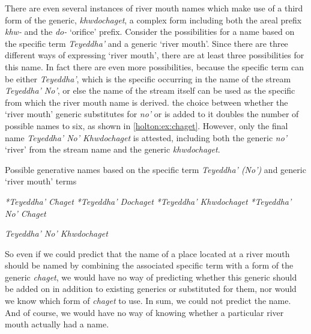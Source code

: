 There are even several instances of river mouth names which make use of a third form of the generic, \textit{khwdochaget}, a complex form including both the areal prefix \textit{khw-} and the \textit{do-} `orifice’ prefix. Consider the possibilities for a name based on the specific term \textit{Teyeddha’} and a generic ‘river mouth’. Since there are three different ways of expressing ‘river mouth’, there are at least three possibilities for this name. In fact there are even more possibilities, because the specific term can be either \textit{Teyeddha'}, which is the specific occurring in the name of the stream \textit{Teyeddha' No'}, or else the name of the stream itself can be used as the specific from which the river mouth name is derived. the choice between whether the ‘river mouth’ generic substitutes for \textit{no’}  or is added to it doubles the number of possible names to six, as shown in \ref{holton:ex:chaget}. However,  only the final name \textit{Teyeddha' No' Khwdochaget} is attested, including both the generic \textit{no’} ‘river’ from the stream name and the generic \textit{khwdochaget}.



\begin{exe}
\ex Possible generative names based on the specific term \textit{Teyeddha’ (No')} and  generic `river mouth’ terms\label{holton:ex:chaget} 
\begin{xlist}
\ex \textit{*Teyeddha’ Chaget}
\ex \textit{*Teyeddha’ Dochaget}
\ex \textit{*Teyeddha’ Khwdochaget}
\ex \textit{*Teyeddha’ No’ Chaget}

\ex \textit{Teyeddha’ No’ Khwdochaget}

\end{xlist}
\end{exe}

\noindent
So even if we could predict that the name of a place located at a river mouth should be named by combining the associated specific term with a form of the generic \textit{chaget}, we would have no way of predicting whether this generic should be added on in addition to existing generics or substituted for them, nor would we know which form of \textit{chaget} to use. In sum, we could not predict the name. And of course, we would have no way of knowing whether a particular river mouth actually had a name.

